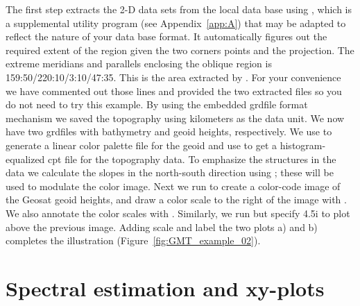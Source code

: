 
The first step extracts the 2-D data sets from the local
data base using , which is a supplemental
utility program (see Appendix~\ref{app:A}) that may be adapted to
reflect the nature of your data base format.  It
automatically figures out the required extent of the region
given the two corners points and the projection.  The extreme
meridians and parallels enclosing the oblique region is
159:50/220:10/3:10/47:35.  This is
the area extracted by .  For your convenience
we have commented out those lines and provided the two
extracted files so you do not need  to try
this example.  By using the embedded grdfile format
mechanism we saved the topography using kilometers as the
data unit.  We now have two grdfiles with bathymetry and
geoid heights, respectively.  We use  to generate
a linear color palette file  for the geoid and use
 to get a histogram-equalized cpt file 
for the topography data.  To emphasize the structures in
the data we calculate the slopes in the north-south direction
using ; these will be used to modulate the
color image.  Next we run  to create a
color-code image of the Geosat geoid heights, and draw a
color scale to the right of the image with .
We also annotate the color scales with .
Similarly, we run  but specify 4.5i
to plot above the previous image.  Adding scale and label
the two plots a) and b) completes the illustration
(Figure~\ref{fig:GMT_example_02}).

\section{Spectral estimation and xy-plots}


